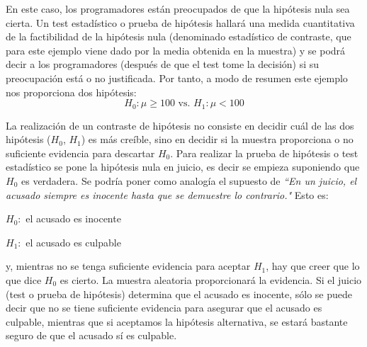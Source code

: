 En este caso, los programadores están preocupados de que la hipótesis nula sea cierta. Un test estadístico o
prueba de hipótesis hallará una medida cuantitativa de la factibilidad de la hipótesis nula (denominado
estadístico de contraste, que para este ejemplo viene dado por la media obtenida en la muestra) y se podrá
decir a los programadores (después de que el test tome la decisión) si su preocupación está o no justificada.
Por tanto, a modo de resumen este ejemplo nos proporciona dos hipótesis:
$$H_0: \mu \geq 100 \mbox{ vs. } H_1: \mu < 100$$

La realización de un contraste de hipótesis no consiste en decidir cuál de las dos hipótesis ($H_0$, $H_1$) es más
creíble, sino en decidir si la muestra proporciona o no suficiente evidencia para descartar $H_0$. Para realizar la
prueba de hipótesis o test estadístico se pone la hipótesis nula en juicio, es decir se empieza suponiendo que $H_0$
es verdadera. Se podría poner como analogía el supuesto de \textit{``En un juicio, el acusado siempre es inocente
hasta que se demuestre lo contrario."} Esto es:
\begin{center}
$H_0:$ el acusado es inocente

$H_1:$ el acusado es culpable
\end{center}
y, mientras no se tenga suficiente evidencia para aceptar $H_1$, hay que creer que lo que dice $H_0$ es cierto. La
muestra aleatoria proporcionará la evidencia. Si el juicio (test o prueba de hipótesis) determina que el acusado
es inocente, sólo se puede decir que no se tiene suficiente evidencia para asegurar que el acusado es culpable,
mientras que si aceptamos la hipótesis alternativa, se estará bastante seguro de que el acusado sí es culpable.


